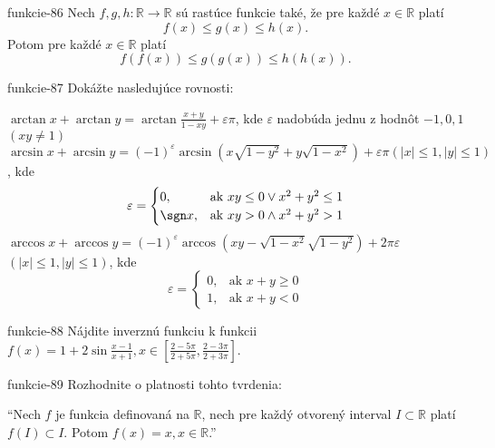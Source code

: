 \begin{defproblem}{funkcie-86}
Nech $f,g,h:\mathbb{R}\rightarrow\mathbb{R}$ sú rastúce funkcie také, že pre
každé $x\in\mathbb{R}$ platí $$f(x)\leq g(x)\leq h(x).$$ Potom pre každé
$x\in\mathbb{R}$ platí $$f(f(x))\leq g(g(x))\leq h(h(x)).$$
\end{defproblem}

\begin{defproblem}{funkcie-87}
Dokážte nasledujúce rovnosti:
\begin{tasks}
\task
  $\arctan x +\arctan y =\arctan\frac{x+y}{1-xy}+\varepsilon\pi$, kde
  $\varepsilon$ nadobúda jednu z hodnôt $-1,0,1$ $(xy\neq 1)$
\task
  $\arcsin x +\arcsin y=(-1)^\varepsilon\arcsin(x\sqrt{1-y^2}+y\sqrt{1-x^2})
  +\varepsilon\pi (|x|\leq 1,|y|\leq 1)$, kde
  \[
    \varepsilon =
      \begin{cases}
        0,      & \text{ak } xy \leq 0 \vee x^2 + y^2 \leq 1 \\
        \sgn x, & \text{ak } xy > 0 \wedge x^2 + y^2 > 1
      \end{cases}
  \]
\task
  $\arccos x +\arccos y =(-1)^\varepsilon \arccos
  (xy-\sqrt{1-x^2}\sqrt{1-y^2})+2\pi\varepsilon$ $(|x|\leq 1,|y|\leq 1)$, kde
  \[
    \varepsilon=
      \begin{cases}
        0, & \text{ak } x + y \geq 0 \\
        1, & \text{ak } x + y < 0
      \end{cases}
  \]
\end{tasks}
\end{defproblem}

\begin{defproblem}{funkcie-88}
Nájdite inverznú funkciu k funkcii
$f(x)=1+2\sin\frac{x-1}{x+1},x\in[\frac{2-5\pi}{2+5\pi},\frac{2-3\pi}{2+3\pi}]$.
\end{defproblem}

\begin{defproblem}{funkcie-89}
Rozhodnite o platnosti tohto tvrdenia:

\enquote{Nech $f$ je funkcia definovaná na $\mathbb{R}$, nech pre každý otvorený
interval $I\subset\mathbb{R}$ platí $f(I)\subset I$. Potom
$f(x)=x,x\in\mathbb{R}$.}
\end{defproblem}